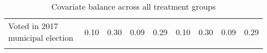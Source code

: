 \begin{table}[H]
{\begin{tabular}[t]{lrrrrrrrr}
Voted in 2017 municipal election & 0.10 & 0.30 & 0.09 & 0.29 & 0.10 & 0.30 & 0.09 & 0.29\\
\cellcolor[HTML]{D3D3D3}{Voted in 2016 general election} & \cellcolor[HTML]{D3D3D3}{0.45} & \cellcolor[HTML]{D3D3D3}{0.50} & \cellcolor[HTML]{D3D3D3}{0.45} & \cellcolor[HTML]{D3D3D3}{0.50} & \cellcolor[HTML]{D3D3D3}{0.45} & \cellcolor[HTML]{D3D3D3}{0.50} & \cellcolor[HTML]{D3D3D3}{0.43} & \cellcolor[HTML]{D3D3D3}{0.50}\\
\bottomrule
\end{tabular}}
\caption{Covariate balance across all treatment groups}
\end{table}
